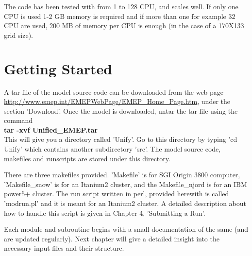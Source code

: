 The code has been tested with from 1 to 128 CPU, and scales well.  If
only one CPU is used 1-2 GB memory is required and if more than one
for example 32 CPU are used, 200 MB of memory per CPU is enough (in
the case of a 170X133 grid size).

\section{Getting Started}

A tar file of the model source code can be downloaded from the web
page \url{http://www.emep.int/EMEPWebPage/EMEP_Home_Page.htm}, under the section 'Download'.   Once the model is downloaded,
untar the tar file using  the command \\

\textbf{tar -xvf Unified\_EMEP.tar} \\

This will give you a directory called 'Unify'.  Go to this directory
by typing 'cd Unify' which contains another subdirectory 'src'.  The
model source code, makefiles and runscripts are stored under this
directory.  

There are three makefiles provided.  'Makefile' is for SGI Origin 3800
computer, 'Makefile\_snow' is for an Itanium2 cluster, and the
Makefile\_njord is for an IBM power5+ cluster. The run script written
in perl, provided
herewith is called 'modrun.pl' and it is meant for an Itanium2
cluster.  A detailed description about how to handle this script
is given in Chapter 4, 'Submitting a Run'.  

Each module and subroutine begins with a small documentation of the
same (and are updated regularly). Next chapter will give a detailed
insight into the necessary input files and their structure.    




